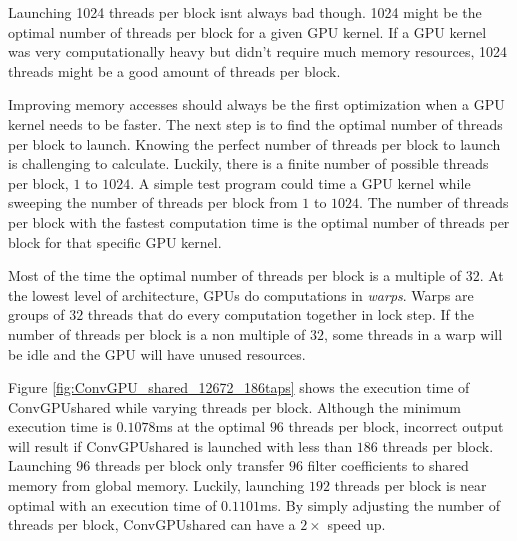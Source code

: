 Launching 1024 threads per block isnt always bad though.
1024 might be the optimal number of threads per block for a given GPU kernel.
If a GPU kernel was very computationally heavy but didn't require much memory resources, 1024 threads might be a good amount of threads per block.

Improving memory accesses should always be the first optimization when a GPU kernel needs to be faster.
The next step is to find the optimal number of threads per block to launch.
Knowing the perfect number of threads per block to launch is challenging to calculate.
Luckily, there is a finite number of possible threads per block, $1$ to $1024$.
A simple test program could time a GPU kernel while sweeping the number of threads per block from $1$ to $1024$.
The number of threads per block with the fastest computation time is the optimal number of threads per block for that specific GPU kernel.

Most of the time the optimal number of threads per block is a multiple of $32$. 
At the lowest level of architecture, GPUs do computations in \textit{warps}.
Warps are groups of $32$ threads that do every computation together in lock step.
If the number of threads per block is a non multiple of $32$, some threads in a warp will be idle and the GPU will have unused resources.

Figure \ref{fig:ConvGPU_shared_12672_186taps} shows the execution time of ConvGPUshared while varying threads per block.
Although the minimum execution time is $0.1078$ms at the optimal $96$ threads per block, incorrect output will result if ConvGPUshared is launched with less than $186$ threads per block.
Launching $96$ threads per block only transfer $96$ filter coefficients to shared memory from global memory.
Luckily, launching $192$ threads per block is near optimal with an execution time of $0.1101$ms.
By simply adjusting the number of threads per block, ConvGPUshared can have a $2\times$ speed up.

